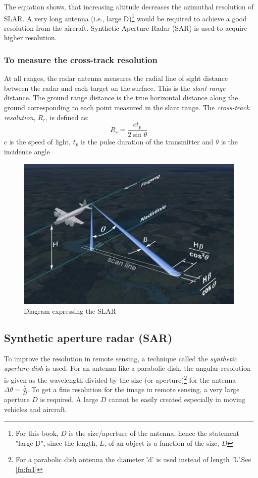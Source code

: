 The equation shows, that increasing altitude decreases the azimuthal resolution of SLAR. A very long antenna (i.e., large D)\footnote{\label{fn:fn1}For this book, $D$ is the size/aperture of the antenna. hence the statement "large D", since the length, $L$, of an object is a function of the size, $D$} would be required to achieve a good resolution from the aircraft. Synthetic Aperture Radar (SAR) is used to acquire higher resolution.

\subsubsection*{To measure the cross-track resolution}
At all ranges, the radar antenna measures the radial line of sight distance between the radar and each target on the surface. This is the \textit{slant range} distance. The ground range distance is the true horizontal distance along the ground corresponding to each point measured in the slant range. The \textit{cross-track resolution}, $R_{r}$, is defined as:  
\begin{dmath*}
R_{r}=\frac{ct_{p}}{2\sin\theta}
\end{dmath*}
$c$ is the speed of light, $t_{p}$ is the pulse duration of the transmitter and $\theta$ is the incidence angle
\begin{figure}[h]
\centering
\includegraphics[scale=0.2]{./graphics/SLAR-resolution}
\caption{Diagram expressing the SLAR}
\end{figure}

\subsection{Synthetic aperture radar (SAR)}
To improve the resolution in remote sensing, a technique called the \textit{synthetic aperture dish} is used. For an antenna like a parabolic dish, the angular resolution is given as the wavelength divided by the size (or aperture)\footnote{For a parabolic dish antenna the diameter 'd' is used instead of length 'L'.See \autoref{fn:fn1}} for the antenna $\Delta \theta = \frac{\lambda}{D}$. To get a fine resolution for the image in remote sensing, a very large aperture $D$ is required. A large $D$ cannot be easily created especially in moving vehicles and aircraft.

